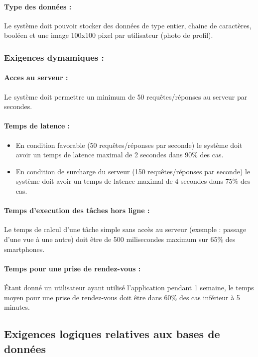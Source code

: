 \documentclass{article}
\begin{document}
\paragraph{Type des données :}
Le système doit pouvoir stocker des données de type entier, chaine de
caractères, booléen et une image 100x100 pixel par utilisateur
(photo de profil).


\subsubsection{Exigences dymamiques :}
\paragraph{Acces au serveur :}
Le système doit permettre un minimum de 50 requêtes/réponses au serveur
par secondes.
\paragraph{Temps de latence :}
\begin{itemize}
\item En condition favorable (50 requêtes/réponses par seconde) le
  système doit avoir un temps de latence maximal de 2 secondes dans
  90\% des cas.
\item En condition de surcharge du serveur (150 requêtes/réponses par
  seconde) le système doit avoir un temps de latence maximal de 4
  secondes dans 75\% des cas.
\end{itemize}

\paragraph{Temps d'execution des tâches hors ligne :}
Le temps de calcul d'une tâche simple sans accès au serveur (exemple : passage d'une vue à
une autre) doit être de 500 milisecondes maximum sur 65\% des
smartphones.

\paragraph{Temps pour une prise de rendez-vous :}
Étant donné un utilisateur ayant utilisé l'application pendant 1
semaine, le temps moyen pour une prise de rendez-vous doit être dans
60\% des cas inférieur à 5 minutes.

\subsection{Exigences logiques relatives aux bases de données}
\end{document}
